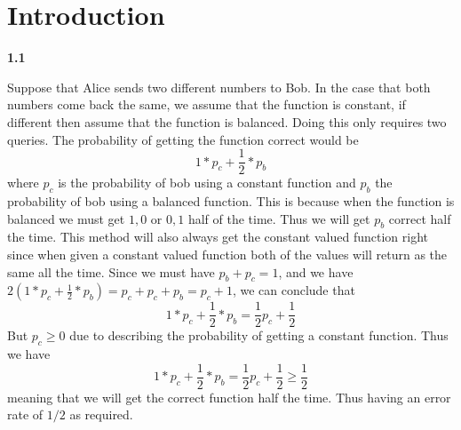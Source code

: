 



\section{Introduction}

\textbf{1.1}

Suppose that Alice sends two different numbers to Bob. In the case that both numbers come back the same, we assume that the function is constant, if different then assume that the function is balanced. Doing this only requires two queries. The probability of getting the function correct would be \[ 1* p_c + \frac{1}{2}*p_b\] where $p_c$ is the probability of bob using a constant function and $ p_b$ the probability of bob using a balanced function. This is because when the function is balanced we must get $1,0$ or $0,1$ half of the time. Thus we will get $p_b$ correct half the time. This method will also always get the constant valued function right since when given a constant valued function both of the values will return as the same all the time. Since we must have $p_b + p_c = 1$, and we have $ 2(1* p_c + \frac{1}{2}*p_b) = p_c + p_c + p_b = p_c +1 $, we can conclude that 
\[ 1* p_c + \frac{1}{2}*p_b = \frac{1}{2}p_c + \frac{1}{2}\]
But $p_c\geq 0$ due to describing the probability of getting a constant function. Thus we have \[ 1* p_c + \frac{1}{2}*p_b = \frac{1}{2}p_c + \frac{1}{2}\geq \frac{1}{2}\]
meaning that we will get the correct function half the time. Thus having an error rate of $1/2$ as required.




